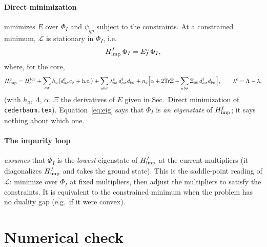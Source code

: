 \documentclass[11pt]{article}
\newcommand{\dg}{^{\dagger}}
\newcommand{\Tr}{\mathrm{Tr}}
\begin{document}
\paragraph{Direct minimization} minimizes $E$ over $\Phi_I$ and $\psi_{qp}$ subject to the constraints. At a constrained minimum, $\mathcal L$ is
stationary in $\Phi_I$, i.e.
\begin{equation}
H^I_{\rm imp}\,\Phi_I=E^c_I\,\Phi_I ,
\label{eq:eig}
\end{equation}
where, for the core,
\begin{equation}
H^c_{\rm imp}=H^{loc}_c+\sum_{a\sigma}h_{a}\big(d\dg_{a\sigma}c_\sigma+\mathrm{h.c.}\big)+\sum_{ab\sigma}\lambda^c_{ab}\,d\dg_{a\sigma}d_{b\sigma}
+n_c\Big[\alpha+2\Tr\Xi-\sum_{ab\sigma}\Xi_{ab}\,d\dg_{a\sigma}d_{b\sigma}\Big],\qquad\lambda^c=\Lambda-\lambda ,
\end{equation}
(with $h_a$, $\Lambda$, $\alpha$, $\Xi$ the derivatives of $E$ given in Sec.~Direct minimization of \texttt{cederbaum.tex}). Equation~\eqref{eq:eig} says that
$\Phi_I$ is \emph{an eigenstate} of $H^I_{\rm imp}$; it says nothing about which one.

\paragraph{The impurity loop} \emph{assumes} that $\Phi_I$ is the \emph{lowest} eigenstate of $H^I_{\rm imp}$ at the current multipliers (it diagonalizes
$H^I_{\rm imp}$ and takes the ground state). This is the saddle-point reading of $\mathcal L$: minimize over $\Phi_I$ at fixed multipliers,
then adjust the multipliers to satisfy the constraints. It is equivalent to the constrained minimum when the problem has no duality gap
(e.g.\ if it were convex).

\section{Numerical check}
\end{document}

